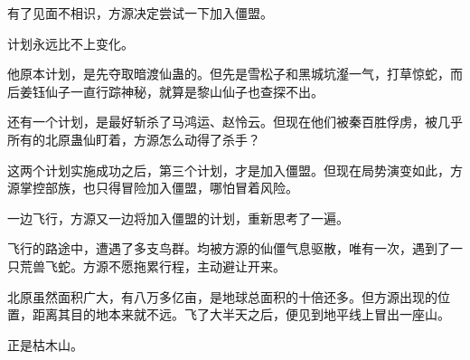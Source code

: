 \begin{this_body}
有了见面不相识，方源决定尝试一下加入僵盟。

计划永远比不上变化。

他原本计划，是先夺取暗渡仙蛊的。但先是雪松子和黑城坑瀣一气，打草惊蛇，而后姜钰仙子一直行踪神秘，就算是黎山仙子也查探不出。

还有一个计划，是最好斩杀了马鸿运、赵怜云。但现在他们被秦百胜俘虏，被几乎所有的北原蛊仙盯着，方源怎么动得了杀手？

这两个计划实施成功之后，第三个计划，才是加入僵盟。但现在局势演变如此，方源掌控部族，也只得冒险加入僵盟，哪怕冒着风险。

一边飞行，方源又一边将加入僵盟的计划，重新思考了一遍。

飞行的路途中，遭遇了多支鸟群。均被方源的仙僵气息驱散，唯有一次，遇到了一只荒兽飞蛇。方源不愿拖累行程，主动避让开来。

北原虽然面积广大，有八万多亿亩，是地球总面积的十倍还多。但方源出现的位置，距离其目的地本来就不远。飞了大半天之后，便见到地平线上冒出一座山。

正是枯木山。

\end{this_body}

